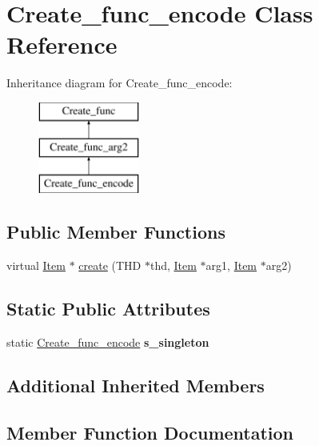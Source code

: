 \hypertarget{classCreate__func__encode}{}\section{Create\+\_\+func\+\_\+encode Class Reference}
\label{classCreate__func__encode}
Inheritance diagram for Create\+\_\+func\+\_\+encode\+:\begin{figure}[H]
\begin{center}
\leavevmode
\includegraphics[height=3.000000cm]{classCreate__func__encode}
\end{center}
\end{figure}
\subsection*{Public Member Functions}
\begin{DoxyCompactItemize}
\item 
virtual \mbox{\hyperlink{classItem}{Item}} $\ast$ \mbox{\hyperlink{classCreate__func__encode_aafd1cce904462d433ccd554397dc9f06}{create}} (T\+HD $\ast$thd, \mbox{\hyperlink{classItem}{Item}} $\ast$arg1, \mbox{\hyperlink{classItem}{Item}} $\ast$arg2)
\end{DoxyCompactItemize}
\subsection*{Static Public Attributes}
\begin{DoxyCompactItemize}
\item 
\mbox{\label{classCreate__func__encode_a1233c5f9f7231db690211c2f7a9035d3}} 
static \mbox{\hyperlink{classCreate__func__encode}{Create\+\_\+func\+\_\+encode}} {\bfseries s\+\_\+singleton}
\end{DoxyCompactItemize}
\subsection*{Additional Inherited Members}


\subsection{Member Function Documentation}
\mbox{\label{classCreate__func__encode_aafd1cce904462d433ccd554397dc9f06}} 
